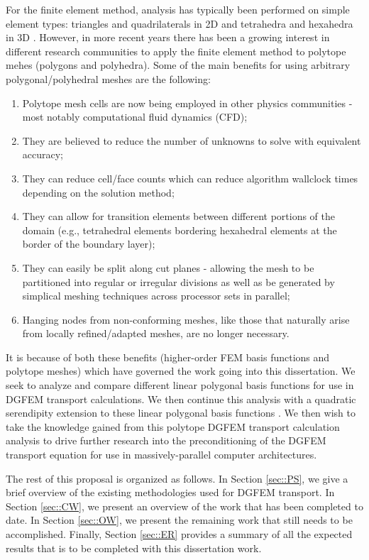 \documentclass[11pt]{article}
\begin{document}
For the finite element method, analysis has typically been performed on simple element types: triangles and quadrilaterals in 2D and tetrahedra and hexahedra in 3D \cite{akin1982application}. However, in more recent years there has been a growing interest in different research communities to apply the finite element method to polytope mehes (polygons and polyhedra). Some of the main benefits for using arbitrary polygonal/polyhedral meshes are the following:

\vspace{4mm}
\begin{enumerate}
	\item Polytope mesh cells are now being employed in other physics communities - most notably computational fluid dynamics (CFD)\cite{ref::star_CCM};
	\item They are believed to reduce the number of unknowns to solve with equivalent accuracy;
	\item They can reduce cell/face counts which can reduce algorithm wallclock times depending on the solution method;
	\item They can allow for transition elements between different portions of the domain (e.g., tetrahedral elements bordering hexahedral elements at the border of the boundary layer);
	\item They can easily be split along cut planes - allowing the mesh to be partitioned into regular or irregular divisions as well as be generated by simplical meshing techniques across processor sets in parallel;
	\item Hanging nodes from non-conforming meshes, like those that naturally arise from locally refined/adapted meshes, are no longer necessary. 
\end{enumerate}
\vspace{4mm}

It is because of both these benefits (higher-order FEM basis functions and polytope meshes) which have governed the work going into this dissertation. We seek to analyze and compare different linear polygonal basis functions  for use in DGFEM transport calculations. We then continue this analysis with a quadratic serendipity extension to these linear polygonal basis functions \cite{rand2014quadratic}. We then wish to take the knowledge gained from this polytope DGFEM transport calculation analysis to drive further research into the preconditioning of the DGFEM transport equation for use in massively-parallel computer architectures.

The rest of this proposal is organized as follows. In Section \ref{sec::PS}, we give a brief overview of the existing methodologies used for DGFEM transport. In Section \ref{sec::CW}, we present an overview of the work that has been completed to date. In Section \ref{sec::OW}, we present the remaining work that still needs to be accomplished. Finally, Section \ref{sec::ER} provides a summary of all the expected results that is to be completed with this dissertation work.
\end{document}

